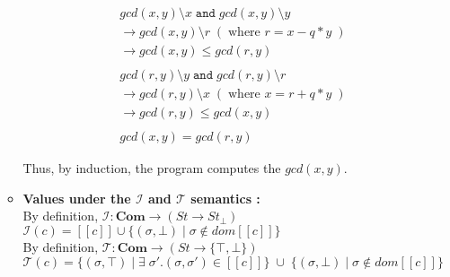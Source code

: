 \documentclass{article}
\newcommand{\andsym}{\mathtt{and}}
\begin{document}
\begin{enumerate}
\begin{itemize}
\begin{align*}
& gcd(x, y) \setminus x \; \andsym \; gcd(x, y) \setminus y \\
& \rightarrow gcd(x, y) \setminus r \; (\; \text{where } r = x - q * y \;) \\
& \rightarrow gcd(x, y) \leq gcd(r, y) \\
& \\
& gcd(r, y) \setminus y \; \andsym \; gcd(r, y) \setminus r \\
& \rightarrow gcd(r, y) \setminus x \; (\; \text{where } x = r + q * y \;)\\
& \rightarrow gcd(r, y) \leq gcd(x, y) \\
& \\
& gcd(x, y) = gcd(r, y)
\end{align*}

Thus, by induction, the program computes the $gcd(x, y)$.\\

\item \textbf{Values under the $\mathcal{I}$ and $\mathcal{T}$ semantics :}\\

	By definition, 
	$\mathcal{I} : \textbf{Com} \rightarrow (St \rightarrow St_{ \bot })$\\

	$ \mathcal{I}(c) = [[ c ]] \cup  \{ (\sigma, \bot) \; | \; \sigma
	\notin dom [[ c ]] \} $\\

	By definition, 	
	$\mathcal{T} : \textbf{Com} \rightarrow (St \rightarrow \{ \top, \bot \} )$\\

	$ \mathcal{T}(c) = \{ ( \sigma, \top ) \; | \; \exists \; \sigma'.(\sigma,
	\sigma') \in [[ c ]] \} \; \cup \; \{ ( \sigma, \bot) \; | \; \sigma \notin dom
	[[ c ]] \} $\\
	
	\begin{itemize}
	  

\end{itemize}
\end{itemize}
\end{enumerate}
\end{document}
